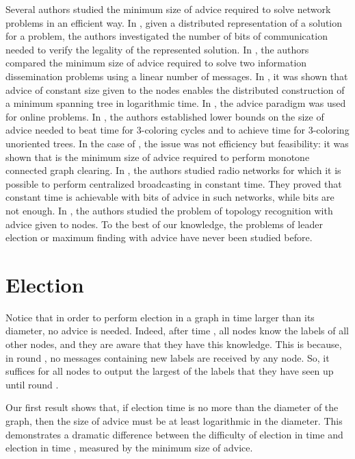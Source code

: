 \documentclass[11pt]{article}
\begin{document}
Several authors studied the minimum size of advice required to solve
network problems in an efficient way. 
 In \cite{KKP05}, given a distributed representation of a solution for a problem,
the authors investigated the number of bits of communication needed to verify the legality of the represented solution.
In \cite{FIP1}, the authors compared the minimum size of advice required to
solve two information dissemination problems using a linear number of messages. 
In \cite{FKL}, it was shown that advice of constant size given to the nodes enables the distributed construction of a minimum
spanning tree in logarithmic time. 
In \cite{EFKR}, the advice paradigm was used for online problems.
In \cite{FGIP}, the authors established lower bounds on the size of advice 
needed to beat time 
for 3-coloring cycles and to achieve time  for 3-coloring unoriented trees.  
In the case of \cite{SN}, the issue was not efficiency but feasibility: it
was shown that  is the minimum size of advice
required to perform monotone connected graph clearing.
In \cite{IKP}, the authors studied radio networks for
which it is possible to perform centralized broadcasting in constant time. They proved that constant time is achievable with
 bits of advice in such networks, while
 bits are not enough. In \cite{FPR}, the authors studied the problem of topology recognition with advice given to nodes. 
To the best of our knowledge, the problems of leader election or maximum finding with advice have never been studied before.


\section{Election}


Notice that in order to perform election in a graph  in time larger than its diameter, no advice is needed. Indeed, after time , all nodes
know the labels of all other nodes, and  they are aware that they have this knowledge. This is because, in round , no messages containing new labels are received by any node. So, it suffices for all nodes to output the largest of the labels that they have seen up until round . 

Our first result shows that, if election time is no more than the diameter of the graph, then the size of advice must be at least logarithmic in the diameter. 
This demonstrates a dramatic difference between the difficulty of election in time  and election in time , measured by the minimum size of advice.
\end{document}
